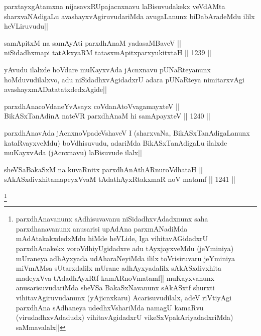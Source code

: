 \begin{artha}
parxtayxgAtamxna nijasavxRUpajacnxnavu laBisuvudakekx veVdAMta sharxvaNAdigaLu avashayxvAgiruvudariMda avugaLanunx biDabAradeMdu ililx heVLiruvudu||
\end{artha}


\begin{shl}
samApitxM na samAyAti parxdhAnaM yadasaMBaveV || \\
niSidadhxmapi tatAkxyaRM tatasxmApitxparxyukitxtaH ||  1239 ||  
\end{shl}

\begin{artha}
yAvudu ilalxde hoVdare muKayxvAda jAcnxnavu pUNaRteyanunx hoMduvudilalxvo, adu niSidadhxvAgidadxrU adara pUNaRteya nimitarxvAgi avashayxmADatatatxdedxAgide||
\end{artha}


\begin{shl}
parxdhAnacoVdaneYvAsayx coVdanAtoV\s vagamayxteV || \\
BikASxTanAdinA nateVR parxdhAnaM hi samApayxteV ||  1240 ||  
\end{shl}

\begin{artha}
parxdhAnavAda jAcnxnoVpadeVshaveV I (sharxvaNa, BikASxTanAdigaLanunx kataRvayxveMdu) boVdhisuvudu, adariMda BikASxTanAdigaLu  ilalxde muKayxvAda (jAcnxnavu) laBisuvude ilalx||
\end{artha}

\begin{shl}
sheVSaBakaSxM na kuvaRnitx parxdhAnAthARnuroVdhataH || \\
sAkASxdivxhitamapeyxVvaM tAdathAyxRtakxmaR noV matamf ||  1241 ||  
\end{shl}

\begin{artha}
\footnote{parxdhAnavanunx sAdhisuvavanu niSidadhxvAdadxnunx saha parxdhanavanunx anusarisi upAdAna parxmANadiMda mAdAtakakxdedxMdu hiMde heVLide, Iga vihitavAGidadxrU parxdhAnakekx voroVdhiyUgidadxre adu tAyxjayxveMdu (jeYminiya) mUraneya adhAyxyada udAharaNeyiMda ililx toVrisiruvaru jeYminiya miVmAMsa sUtarxdalilx mUrane adhAyxyadalilx sAkASxdivxhita madeyxVva tAdadhAyxRtf kamARnoVmatamf|| muKayxvanunx anusarisuvudariMda sheVSa BakaSxNavanunx sAkASxtf shurxti vihitavAgiruvudanunx (yAjicnxkaru) Acarisuvudilalx, adeV riVtiyAgi parxdhAna sAdhaneya udedhxVshariMda namagU kamaRvu (virudadhxvAdadudx) vihitavAgidadxrU vikeSxVpakAriyadadxriMda) saMmavalalx||}
\end{artha}

